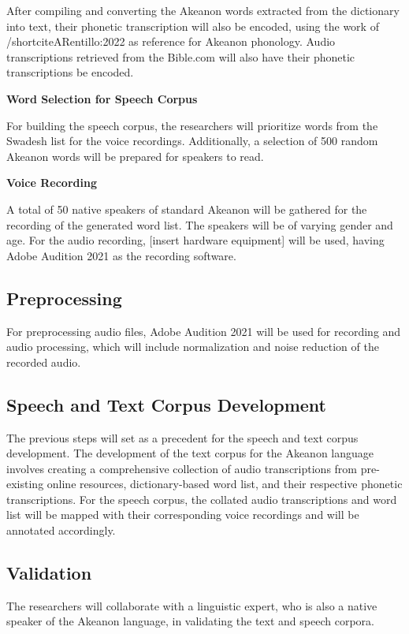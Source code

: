 After compiling and converting the Akeanon words extracted from the dictionary into text, their phonetic transcription will also be encoded, using the work of /shortciteA{Rentillo:2022} as reference for Akeanon phonology. Audio transcriptions retrieved from the Bible.com will also have their phonetic transcriptions be encoded.

\textbf{Word Selection for Speech Corpus}

For building the speech corpus, the researchers will prioritize words from the Swadesh list for the voice recordings. Additionally, a selection of 500 random Akeanon words will be prepared for speakers to read.

\textbf{Voice Recording}

A total of 50 native speakers of standard Akeanon will be gathered for the recording of the generated word list. The speakers will be of varying gender and age. For the audio recording, [insert hardware equipment] will be used, having Adobe Audition 2021 as the recording software.

\subsection{Preprocessing}
For preprocessing audio files, Adobe Audition 2021 will be used for recording and audio processing, which will include normalization and noise reduction of the recorded audio.

\subsection{Speech and Text Corpus Development}
The previous steps will set as a precedent for the speech and text corpus development. The development of the text corpus for the Akeanon language involves creating a comprehensive collection of audio transcriptions from pre-existing online resources, dictionary-based word list, and their respective phonetic transcriptions. For the speech corpus, the collated audio transcriptions and word list will be mapped with their corresponding voice recordings and will be annotated accordingly.

\subsection{Validation}
The researchers will collaborate with a linguistic expert, who is also a native speaker of the Akeanon language, in validating the text and speech corpora.

